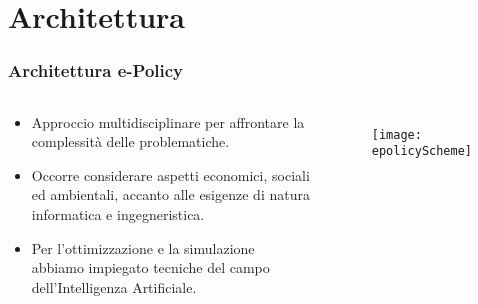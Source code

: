 \documentclass{beamer}
\begin{document}
\section{Architettura}
	\begin{frame}
		\frametitle{Architettura e-Policy}
		\begin{columns}
		\begin{block}{}
			\begin{itemize}
				\item Approccio multidisciplinare per affrontare la complessità delle problematiche.
				\item Occorre considerare aspetti economici, sociali ed ambientali, accanto alle esigenze di natura informatica e ingegneristica.
				\item Per l'ottimizzazione e la simulazione abbiamo impiegato tecniche del campo dell'Intelligenza Artificiale.
			\end{itemize}
		\end{block}

			\begin{figure}[hbt]
				\centering
				\texttt{[image: epolicyScheme]}
			\label{epolicyScheme}
		\end{figure}
		\end{columns}
  	\end{frame}
  	
\end{document}

